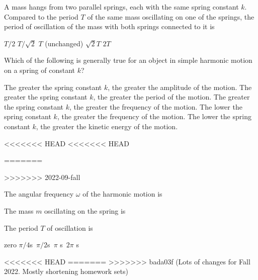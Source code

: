 \documentclass{../../oss-apphys-exam}
\begin{document}
\begin{multicols*}{2}
\begin{questions}
    \question A mass hangs from two parallel springs, each with the same spring
    constant $k$. Compared to the period $T$ of the same mass oscillating on
    one of the springs, the period of oscillation of the mass with both
    springs connected to it is
    \begin{choices}
      \choice $T/2$
      \choice $T/\sqrt2$
      \choice $T$ (unchanged)
      \choice $\sqrt2T$
      \choice $2T$
    \end{choices}

    
    \question Which of the following is generally true for an object in simple
    harmonic motion on a spring of constant $k$?
    \begin{choices}
      \choice The greater the spring constant $k$, the greater the amplitude of
      the motion.
      \choice The greater the spring constant $k$, the greater the period of
      the motion.
      \choice The greater the spring constant $k$, the greater the frequency of
      the motion.
      \choice The lower the spring constant $k$, the greater the frequency of
      the motion.
      \choice The lower the spring constant $k$, the greater the kinetic energy
      of the motion.
    \end{choices}
<<<<<<< HEAD
<<<<<<< HEAD
    \columnbreak

=======
    \vspace{.55in}
    
>>>>>>> 2022-09-fall

    \question The angular frequency $\omega$ of the harmonic motion is
    \label{first}

    \question The mass $m$ oscillating on the spring is
    
    \question The period $T$ of oscillation is
    \begin{choices}
      \choice zero
      \choice $\pi/4$\si\second
      \choice $\pi/2$\si\second
      \choice $\pi$  \si\second
      \choice $2\pi$ \si\second
    \end{choices}
<<<<<<< HEAD
    \label{last}
=======
    \vspace{.7in}
>>>>>>> bada03f (Lots of changes for Fall 2022. Mostly shortening homework sets)
    

\end{questions}
\end{multicols*}
\end{document}
